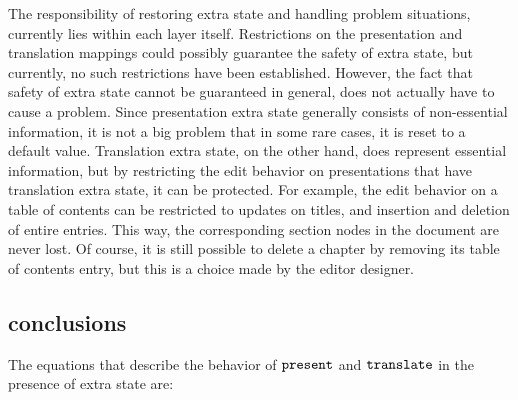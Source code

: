 The responsibility of restoring extra state and handling problem situations, currently lies within each layer itself. Restrictions on the presentation and translation mappings could possibly guarantee the safety of extra state, but currently, no such restrictions have been established. However, the fact that safety of extra state cannot be guaranteed in general, does not actually have to cause a problem. Since presentation extra state generally consists of non-essential information, it is not a big problem that in some rare cases, it is reset to a default value.  Translation extra state, on the other hand, does represent essential information, but by restricting the edit behavior on presentations that have translation extra state, it can be protected. For example, the edit behavior on a table of contents can be restricted to updates on titles, and insertion and deletion of entire entries. This way, the corresponding section nodes in the document are never lost. Of course, it is still possible to delete a chapter by removing its table of contents entry, but this is a choice made by the editor designer. 






%																
\subsection{conclusions}

The equations that describe the behavior of ${\tt present}$ and ${\tt translate}$ in the presence of extra state are:

